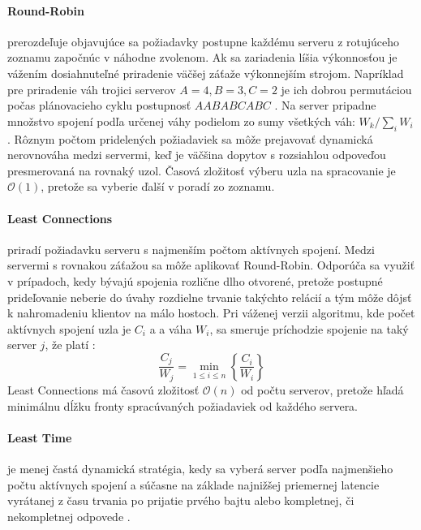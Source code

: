 \documentclass[12pt, a4paper]{article}
\begin{document}
\paragraph{Round-Robin} prerozdeľuje objavujúce sa požiadavky postupne každému serveru z 
rotujúceho zoznamu započnúc v náhodne zvolenom. Ak sa zariadenia líšia výkonnosťou je vážením dosiahnuteľné
priradenie väčšej záťaže výkonnejším strojom. Napríklad pre priradenie váh trojici serverov $A=4, B=3, C=2$ 
je ich dobrou permutáciou počas plánovacieho cyklu postupnosť $AABABCABC$  \cite{LVS}. Na server pripadne 
množstvo spojení podľa určenej váhy podielom zo sumy všetkých váh: $W_k / \sum_i{W_i}$. Rôznym počtom 
pridelených požiadaviek sa môže prejavovať dynamická nerovnováha medzi servermi, keď je väčšina dopytov s 
rozsiahlou odpoveďou presmerovaná na rovnaký uzol. Časová zložitosť výberu uzla na spracovanie
je $\mathcal{O}(1)$, pretože sa vyberie ďalší v poradí zo zoznamu.

\paragraph{Least Connections} priradí požiadavku serveru s najmenším počtom aktívnych spojení. Medzi
servermi s rovnakou záťažou sa môže aplikovať Round-Robin. Odporúča sa využiť v prípadoch, kedy bývajú
spojenia rozlične dlho otvorené, pretože postupné prideľovanie neberie do úvahy rozdielne trvanie takýchto 
relácií a tým môže dôjsť k nahromadeniu klientov na málo hostoch. Pri váženej verzii algoritmu, kde
počet aktívnych spojení uzla je $C_i$ a a váha $W_i$, sa smeruje príchodzie spojenie na taký server $j$, že 
platí \cite{LVS}: $$\frac{C_j}{W_j} = \min_{1 \leq i \leq n}{\left\{\frac{C_i}{W_i}\right\}}$$
Least Connections má časovú zložitosť $\mathcal{O}(n)$ od počtu serverov, pretože hľadá minimálnu
dĺžku fronty spracúvaných požiadaviek od každého servera. 

\paragraph{Least Time} je menej častá dynamická stratégia, kedy sa vyberá server podľa najmenšieho počtu 
aktívnych spojení a súčasne na základe najnižšej priemernej latencie vyrátanej z času trvania po prijatie
prvého bajtu alebo kompletnej, či nekompletnej odpovede \cite{nginx-http-balancer}.
\end{document}
